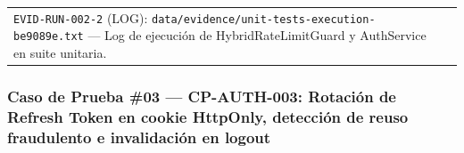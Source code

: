 \documentclass[10pt,a4paper]{article}
\begin{document}
{\begin{longtable}[]{@{}
  >{\raggedright\arraybackslash}p{}
  >{\raggedright\arraybackslash}p{}@{}}
\begin{minipage}[t]{\linewidth}
\texttt{EVID-{}\allowbreak{}RUN-{}\allowbreak{}002-{}\allowbreak{}2} (LOG): \texttt{data/\allowbreak{}evidence/\allowbreak{}unit-{}\allowbreak{}tests-{}\allowbreak{}execution-{}\allowbreak{}be9089e.\allowbreak{}txt} --- Log de ejecución de HybridRateLimitGuard y AuthService en suite unitaria.\strut
\end{minipage} \\
\end{longtable}
}

\endgroup\medskip


\subsubsection{Caso de Prueba \#03 --- CP-AUTH-003: Rotación de Refresh Token en cookie HttpOnly, detección de reuso fraudulento e invalidación en logout}\label{caso-de-prueba-03--cp-auth-003-rotaciuxf3n-de-refresh-token-en-cookie-httponly-detecciuxf3n-de-reuso-fraudulento-e-invalidaciuxf3n-en-logout}

\begingroup\singlespacing\footnotesize\setlength{\parskip}{0pt}
\end{document}
